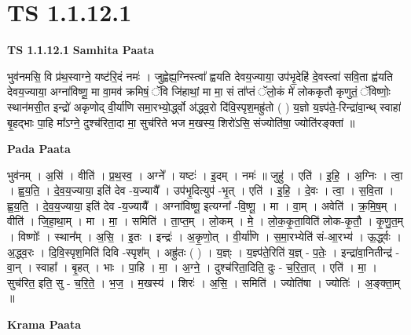 \documentclass[17pt]{extarticle}
\begin{document}
\section{ TS 1.1.12.1 }

\textbf{TS 1.1.12.1 } \newline
\textbf{Samhita Paata} \newline

भुव॑नमसि॒ वि प्र॑थ॒स्वाग्ने॒ यष्ट॑रि॒दं नमः॑ । जुह्वेह्य॒ग्निस्त्वा᳚ ह्वयति देवय॒ज्याया॒ उप॑भृ॒देहि॑ दे॒वस्त्वा॑ सवि॒ता ह्व॑यति देवय॒ज्याया॒ अग्ना॑विष्णू॒ मा वा॒मव॑ क्रमिषं॒ ॅवि जि॑हाथां॒ मा मा॒ सं ता᳚प्तं ॅलो॒कं मे॑ लोककृतौ कृणुतं॒ ॅविष्णोः॒ स्थान॑मसी॒त इन्द्रो॑ अकृणोद् वी॒र्या॑णि समा॒रभ्यो॒र्द्ध्वो अ॑द्ध्व॒रो दि॑वि॒स्पृश॒मह्रु॑तो ( ) य॒ज्ञो य॒ज्ञ्प॑ते॒-रिन्द्रा॑वा॒न्थ् स्वाहा॑ बृ॒हद्भाः पा॒हि मा᳚ऽग्ने॒ दुश्च॑रिता॒दा मा॒ सुच॑रिते भज म॒खस्य॒ शिरो॑ऽसि॒ संज्योति॑षा॒ ज्योति॑रङ्क्तां ॥ \newline

\textbf{Pada Paata} \newline

भुव॑नम् । अ॒सि॑ । वीति॑ । प्र॒थ॒स्व॒ । अग्ने᳚ । यष्टः॑ । इ॒दम् । नमः॑ ॥ जुहु॑ । एति॑ । इ॒हि॒ । अ॒ग्निः । त्वा॒ । ह्व॒य॒ति॒ । दे॒व॒य॒ज्याया॒ इति॑ देव -य॒ज्यायै᳚ । उप॑भृ॒दित्युप॑ -भृ॒त् । एति॑ । इ॒हि॒ । दे॒वः । त्वा॒ । स॒वि॒ता । ह्व॒य॒ति॒ । दे॒व॒य॒ज्याया॒ इति॑ देव -य॒ज्यायै᳚ । अग्ना॑विष्णू॒ इत्यग्ना᳚ -वि॒ष्णू॒ । मा । वा॒म् । अवेति॑ । क्र॒मि॒ष॒म् । वीति॑ । जि॒हा॒था॒म् । मा । मा॒ । समिति॑ । ता॒प्त॒म् । लो॒कम् । मे॒ । लो॒क॒कृ॒ता॒विति॑ लोक-कृ॒तौ॒ । कृ॒णु॒त॒म् । विष्णोः᳚ । स्थान᳚म् । अ॒सि॒ । इ॒तः । इन्द्रः॑ । अ॒कृ॒णो॒त् । वी॒र्या॑णि । स॒मा॒रभ्येति॑ सं-आ॒रभ्य॑ । ऊ॒र्द्ध्वः । अ॒द्ध्व॒रः । दि॒वि॒स्पृश॒मिति॑ दिवि -स्पृश᳚म् । अह्रु॑तः ( ) । य॒ज्ञ्ः । य॒ज्ञ्प॑ते॒रिति॑ य॒ज्ञ् - प॒तेः॒ । इन्द्रा॑वा॒नितीन्द्र॑ - वा॒न् । स्वाहा᳚ । बृ॒हत् । भाः । पा॒हि । मा॒ । अ॒ग्ने॒ । दुश्च॑रिता॒दिति॒ दुः - च॒रि॒ता॒त् । एति॑ । मा॒ । सुच॑रित॒ इति॒ सु - च॒रि॒ते॒ । भ॒ज॒ । म॒खस्य॑ । शिरः॑ । अ॒सि॒ । समिति॑ । ज्योति॑षा । ज्योतिः॑ । अ॒ङ्क्ता॒म् ॥  \newline


\textbf{Krama Paata} \newline
\end{document}
